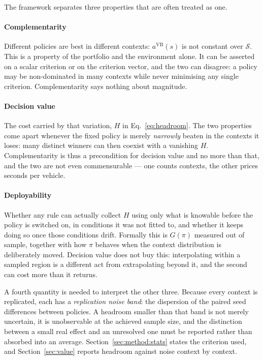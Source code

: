 \documentclass[preprint,12pt]{elsarticle}
\begin{document}
The framework separates three properties that are often treated as one.

\paragraph{Complementarity} Different policies are best in different contexts:
$a^{\mathrm{VB}}(s)$ is not constant over $\mathcal{S}$. This is a property of
the portfolio and the environment alone. It can be asserted on a scalar
criterion or on the criterion vector, and the two can disagree: a policy may be
non-dominated in many contexts while never minimising any single criterion.
Complementarity says nothing about magnitude.

\paragraph{Decision value} The cost carried by that variation, $H$ in
Eq.~\eqref{eq:headroom}. The two properties come apart whenever the fixed policy
is merely \emph{narrowly} beaten in the contexts it loses: many distinct winners
can then coexist with a vanishing $H$. Complementarity is thus a precondition
for decision value and no more than that, and the two are not even commensurable
--- one counts contexts, the other prices seconds per vehicle.

\paragraph{Deployability} Whether any rule can actually collect $H$ using only
what is knowable before the policy is switched on, in conditions it was not
fitted to, and whether it keeps doing so once those conditions drift. Formally
this is $G(\pi)$ measured out of sample, together with how $\pi$ behaves when the
context distribution is deliberately moved. Decision value does not buy this:
interpolating within a sampled region is a different act from extrapolating
beyond it, and the second can cost more than it returns.

A fourth quantity is needed to interpret the other three. Because every context
is replicated, each has a \emph{replication noise band}: the dispersion of the
paired seed differences between policies. A headroom smaller than that band is
not merely uncertain, it is unobservable at the achieved sample size, and the
distinction between a small real effect and an unresolved one must be reported
rather than absorbed into an average. Section~\ref{sec:method:stats} states the
criterion used, and Section~\ref{sec:value} reports headroom against noise
context by context.
\end{document}
